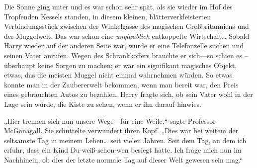 Die Sonne ging unter und es war schon sehr spät, als sie wieder im Hof des Tropfenden Kessels standen, in diesem kleinen, blätterverkleisterten Verbindungsstück zwischen der Winkelgasse des magischen Großbritanniens und der Muggelwelt. Das war schon eine \emph{unglaublich} entkoppelte Wirtschaft… Sobald Harry wieder auf der anderen Seite war, würde er eine Telefonzelle suchen und seinen Vater anrufen. Wegen des Schrankkoffers brauchte er sich—so schien es – überhaupt keine Sorgen zu machen; er war ein signifikant magisches Objekt, etwas, das die meisten Muggel nicht einmal wahrnehmen würden. So etwas konnte man in der Zaubererwelt bekommen, wenn man bereit war, den Preis eines gebrauchten Autos zu bezahlen. Harry fragte sich, ob sein Vater wohl in der Lage sein würde, die Kiste zu sehen, wenn er ihn darauf hinwies.

„Hier trennen sich nun unsere Wege—für eine Weile,“ sagte Professor McGonagall. Sie schüttelte verwundert ihren Kopf. „Dies war bei weitem der seltsamste Tag in meinem Leben… seit vielen Jahren. Seit dem Tag, an dem ich erfuhr, dass ein Kind Du-weiß-schon-wen besiegt hatte. Ich frage mich nun im Nachhinein, ob dies der letzte normale Tag auf dieser Welt gewesen sein mag.“

